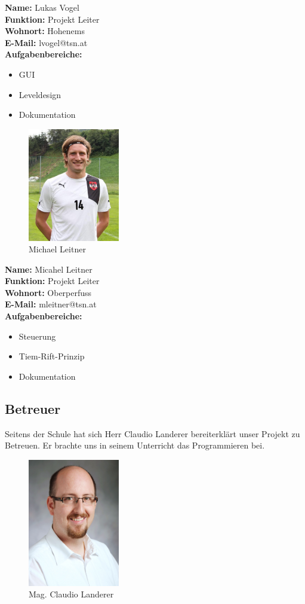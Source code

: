 	\textbf{Name:} Lukas Vogel\\
\textbf{Funktion:} Projekt Leiter\\
\textbf{Wohnort:} Hohenems\\
\textbf{E-Mail:} lvogel@tsn.at\\
\textbf{Aufgabenbereiche:} \begin{itemize}
	\item GUI
	\item Leveldesign
	\item Dokumentation
\end{itemize}
\begin{figure}[H]
	\centering
	\includegraphics[width=4cm]{images/leitnerBeisp.jpg}
	\caption{Michael Leitner}
\end{figure}
	\textbf{Name:} Micahel Leitner\\
\textbf{Funktion:} Projekt Leiter\\
\textbf{Wohnort:} Oberperfuss\\
\textbf{E-Mail:} mleitner@tsn.at\\
\textbf{Aufgabenbereiche:} \begin{itemize}
	\item Steuerung
	\item Tiem-Rift-Prinzip
	\item Dokumentation
\end{itemize}
\newpage
\subsection{Betreuer}
Seitens der Schule hat sich Herr Claudio Landerer bereiterklärt unser Projekt zu Betreuen. Er brachte uns in seinem Unterricht das Programmieren bei. 
	\begin{figure}[H]
		\centering
		\includegraphics[width=4cm]{images/Landerer_Claudio.jpg}
		\caption{Mag. Claudio Landerer}
	\end{figure}
		
